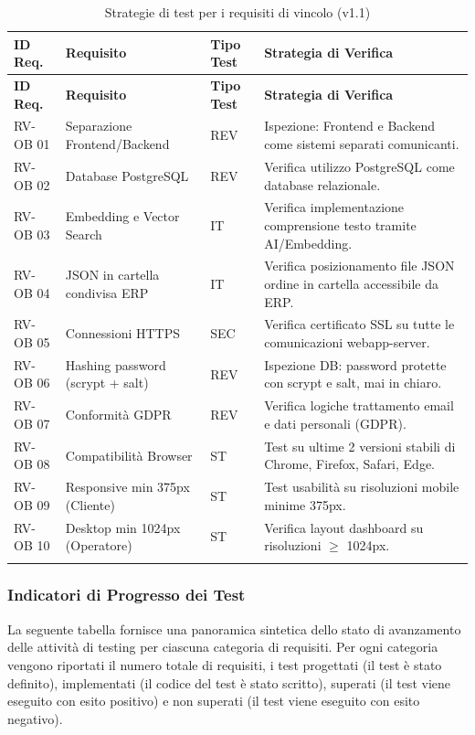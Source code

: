 \documentclass[a4paper,11pt,oneside]{scrartcl}
\begin{document}
\begin{longtable}{|p{1.5cm}|p{5.5cm}|p{1.8cm}|p{5cm}|}
\hline
\textbf{ID Req.} & \textbf{Requisito} & \textbf{Tipo Test} & \textbf{Strategia di Verifica} \\
\hline
\endfirsthead
\hline
\textbf{ID Req.} & \textbf{Requisito} & \textbf{Tipo Test} & \textbf{Strategia di Verifica} \\
\hline
\endhead

RV-OB 01 & Separazione Frontend/Backend & REV & Ispezione: Frontend e Backend come sistemi separati comunicanti. \\ \hline
RV-OB 02 & Database PostgreSQL & REV & Verifica utilizzo PostgreSQL come database relazionale. \\ \hline
RV-OB 03 & Embedding e Vector Search & IT & Verifica implementazione comprensione testo tramite AI/Embedding. \\ \hline
RV-OB 04 & JSON in cartella condivisa ERP & IT & Verifica posizionamento file JSON ordine in cartella accessibile da ERP. \\ \hline
RV-OB 05 & Connessioni HTTPS & SEC & Verifica certificato SSL su tutte le comunicazioni webapp-server. \\ \hline
RV-OB 06 & Hashing password (scrypt + salt) & REV & Ispezione DB: password protette con scrypt e salt, mai in chiaro. \\ \hline
RV-OB 07 & Conformità GDPR & REV & Verifica logiche trattamento email e dati personali (GDPR). \\ \hline
RV-OB 08 & Compatibilità Browser & ST & Test su ultime 2 versioni stabili di Chrome, Firefox, Safari, Edge. \\ \hline
RV-OB 09 & Responsive min 375px (Cliente) & ST & Test usabilità su risoluzioni mobile minime 375px. \\ \hline
RV-OB 10 & Desktop min 1024px (Operatore) & ST & Verifica layout dashboard su risoluzioni $\ge$ 1024px. \\ \hline
\caption{Strategie di test per i requisiti di vincolo (v1.1)}
\end{longtable}

\newpage
\subsubsection{Indicatori di Progresso dei Test}

La seguente tabella fornisce una panoramica sintetica dello stato di avanzamento delle attività di testing per ciascuna categoria di requisiti. Per ogni categoria vengono riportati il numero totale di requisiti, i test progettati (il test è stato definito), implementati (il codice del test è stato scritto), superati (il test viene eseguito con esito positivo) e non superati (il test viene eseguito con esito negativo).
\end{document}
